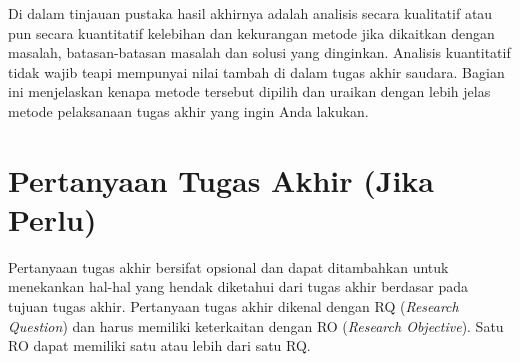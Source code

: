 Di dalam tinjauan pustaka hasil akhirnya adalah analisis secara kualitatif atau pun secara kuantitatif kelebihan dan kekurangan metode jika dikaitkan dengan masalah, batasan-batasan masalah dan solusi yang dinginkan. Analisis kuantitatif tidak wajib teapi mempunyai nilai tambah di dalam tugas akhir saudara. Bagian ini menjelaskan kenapa metode tersebut dipilih dan uraikan dengan lebih jelas metode pelaksanaan tugas akhir yang ingin Anda lakukan. 

\section{Pertanyaan Tugas Akhir (Jika Perlu)}

Pertanyaan tugas akhir bersifat opsional dan dapat ditambahkan untuk menekankan hal-hal yang hendak diketahui dari tugas akhir berdasar pada tujuan tugas akhir. Pertanyaan tugas akhir dikenal dengan RQ (\textit{Research Question}) dan harus memiliki keterkaitan dengan RO (\textit{Research Objective}). Satu RO dapat memiliki satu atau lebih dari satu RQ. 

